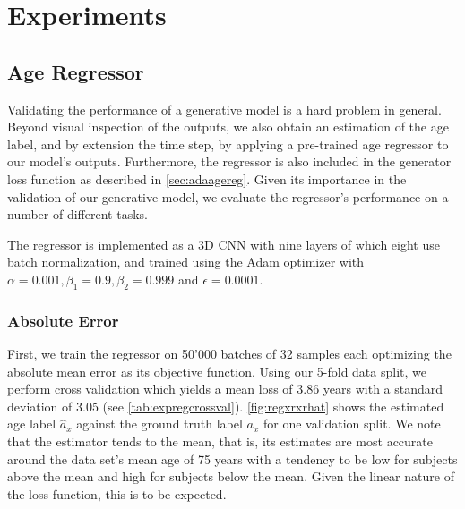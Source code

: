 \chapter{Experiments}

\section{Age Regressor} \label{sec:expreg}
Validating the performance of a generative model is a hard problem in general. Beyond visual inspection of the outputs, we also obtain an estimation of the age label, and by extension the time step, by applying a pre-trained age regressor to our model's outputs. Furthermore, the regressor is also included in the generator loss function as described in \autoref{sec:adaagereg}. Given its importance in the validation of our generative model, we evaluate the regressor's performance on a number of different tasks.

The regressor is implemented as a 3D CNN with nine layers of which eight use batch normalization, and trained using the Adam optimizer with $\alpha = 0.001, \beta_1 = 0.9, \beta_2 = 0.999 $ and $ \epsilon = 0.0001 $.

\subsection*{Absolute Error}
First, we train the regressor on 50'000 batches of 32 samples each optimizing the absolute mean error as its objective function. Using our 5-fold data split, we perform cross validation which yields a mean loss of 3.86 years with a standard deviation of 3.05 (see \autoref{tab:expregcrossval}). \autoref{fig:regxrxrhat} shows the estimated age label $ \hat a_x $ against the ground truth label $a_x$ for one validation split. We note that the estimator tends to the mean, that is, its estimates are most accurate around the data set's mean age of 75 years with a tendency to be low for subjects above the mean and high for subjects below the mean. Given the linear nature of the loss function, this is to be expected.

